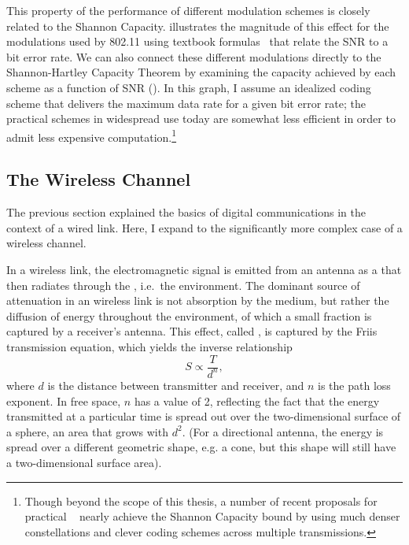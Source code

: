 This property of the performance of different modulation schemes is closely related to the Shannon Capacity.  illustrates the magnitude of this effect for the modulations used by 802.11 using textbook formulas~\cite{Sklar} that relate the SNR to a bit error rate. We can also connect these different modulations directly to the Shannon-Hartley Capacity Theorem by examining the capacity achieved by each scheme as a function of SNR (). In this graph, I assume an idealized coding scheme that delivers the maximum data rate for a given bit error rate; the practical schemes in widespread use today are somewhat less efficient in order to admit less expensive computation.\footnote{Though beyond the scope of this thesis, a number of recent proposals for practical ~\cite{Gudipati_Strider,Perry_Spinal} nearly achieve the Shannon Capacity bound by using much denser constellations and clever coding schemes across multiple transmissions.}

\subsection{The Wireless Channel}
The previous section explained the basics of digital communications in the context of a wired link. Here, I expand to the significantly more complex case of a wireless channel.

In a wireless link, the electromagnetic signal is emitted from an antenna as a  that then radiates through the , i.e.\ the environment. The dominant source of attenuation in an wireless link is not absorption by the medium, but rather the diffusion of energy throughout the environment, of which a small fraction is captured by a receiver's antenna. This effect, called , is captured by the Friis transmission equation, which yields the inverse relationship
\begin{equation}
\label{eq:friis}
	S \propto \frac{T}{d^n},
\end{equation}
where $d$ is the distance between transmitter and receiver, and $n$ is the path loss exponent. In free space, $n$ has a value of 2, reflecting the fact that the energy transmitted at a particular time is spread out over the two-dimensional surface of a sphere, an area that grows with $d^2$. (For a directional antenna, the energy is spread over a different geometric shape, e.g. a cone, but this shape will still have a two-dimensional surface area).

